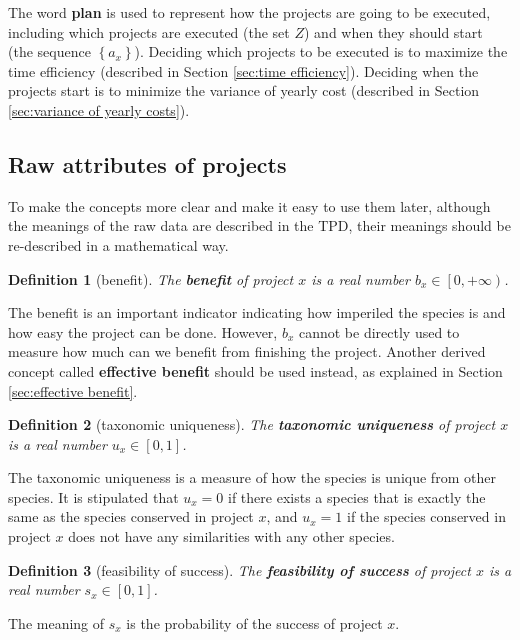 \documentclass{article}
\newtheorem{definition}{Definition}
\begin{document}
The word \textbf{plan} is used to represent how the projects are going to be executed,
including which projects are executed (the set $Z$) and when they should start (the sequence $\left\{a_x\right\}$).
Deciding which projects to be executed is to maximize the time efficiency (described in Section \ref{sec:time efficiency}).
Deciding when the projects start is to minimize the variance of yearly cost (described in Section \ref{sec:variance of yearly costs}).

\subsection{Raw attributes of projects}
\label{sec:raw attributes}

To make the concepts more clear and make it easy to use them later,
although the meanings of the raw data are described in the TPD,
their meanings should be re-described in a mathematical way.

\begin{definition}[benefit]
The \textbf{benefit} of project $x$ is a real number $b_x\in\left[0,+\infty\right)$.
\end{definition}

The benefit is an important indicator indicating how imperiled the species is and how easy the project can be done.
However, $b_x$ cannot be directly used to measure how much can we benefit from finishing the project.
Another derived concept called \textbf{effective benefit} should be used instead, as explained in Section \ref{sec:effective benefit}.

\begin{definition}[taxonomic uniqueness]
The \textbf{taxonomic uniqueness} of project $x$ is a real number $u_x\in\left[0,1\right]$.
\end{definition}

The taxonomic uniqueness is a measure of how the species is unique from other species.
It is stipulated that $u_x=0$ if there exists a species that is exactly the same as the species conserved in project $x$,
and $u_x=1$ if the species conserved in project $x$ does not have any similarities with any other species.

\begin{definition}[feasibility of success]
The \textbf{feasibility of success} of project $x$ is a real number $s_x\in\left[0,1\right]$.
\end{definition}

The meaning of $s_x$ is the probability of the success of project $x$.
\end{document}
